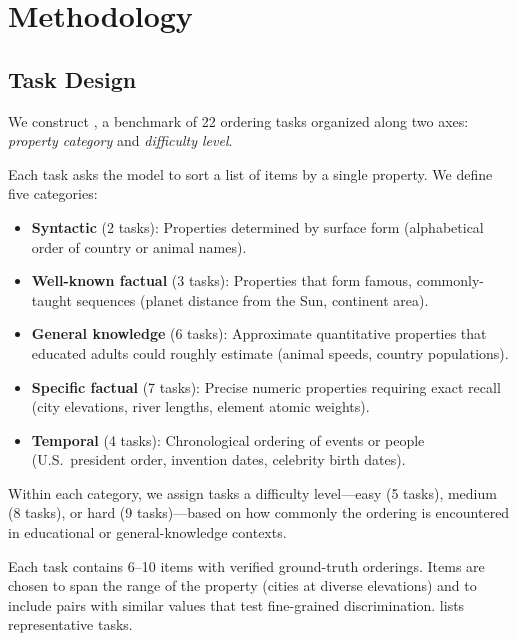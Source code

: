 \section{Methodology}
\label{sec:method}

\subsection{Task Design}
\label{sec:task_design}

We construct \benchname, a benchmark of 22 ordering tasks organized along two axes: \emph{property category} and \emph{difficulty level}.

Each task asks the model to sort a list of items by a single property.
We define five categories:
\begin{itemize}[leftmargin=*,itemsep=0pt,topsep=0pt]
    \item \textbf{Syntactic} (2 tasks): Properties determined by surface form (\eg alphabetical order of country or animal names).
    \item \textbf{Well-known factual} (3 tasks): Properties that form famous, commonly-taught sequences (\eg planet distance from the Sun, continent area).
    \item \textbf{General knowledge} (6 tasks): Approximate quantitative properties that educated adults could roughly estimate (\eg animal speeds, country populations).
    \item \textbf{Specific factual} (7 tasks): Precise numeric properties requiring exact recall (\eg city elevations, river lengths, element atomic weights).
    \item \textbf{Temporal} (4 tasks): Chronological ordering of events or people (\eg U.S.\ president order, invention dates, celebrity birth dates).
\end{itemize}

Within each category, we assign tasks a difficulty level---easy (5 tasks), medium (8 tasks), or hard (9 tasks)---based on how commonly the ordering is encountered in educational or general-knowledge contexts.

Each task contains 6--10 items with verified ground-truth orderings.
Items are chosen to span the range of the property (\eg cities at diverse elevations) and to include pairs with similar values that test fine-grained discrimination.
 lists representative tasks.

